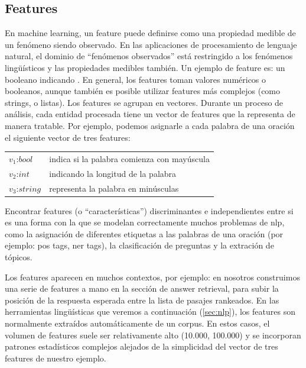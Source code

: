 \subsection*{Features}
\label{subsec:features}

En machine learning, un feature puede definirse como una propiedad medible de un fenómeno siendo observado. En las aplicaciones de procesamiento de lenguaje natural, el dominio de “fenómenos observados” está restringido a los fenómenos lingüísticos y las propiedades medibles también. Un ejemplo de feature es: un booleano indicando . En general, los features toman valores numéricos o booleanos, aunque también es posible utilizar features más complejos (como strings, o listas). Los features se agrupan en vectores. Durante un proceso de análisis, cada entidad procesada tiene un vector de features que la representa de manera tratable. Por ejemplo, podemos asignarle a cada palabra de una oración el siguiente vector de tres features:

\begin{center}
\begin{tabular}{ll}
$v_1$:$bool$ & indica si la palabra comienza con mayúscula \\
$v_2$:$int$ & indicando la longitud de la palabra \\
$v_3$:$string$ & representa la palabra en minúsculas \\
\end{tabular}
\end{center}


Encontrar features (o “características”) discriminantes e independientes entre si es una forma con la que se modelan correctamente muchos problemas de nlp, como la asignación de diferentes etiquetas a las palabras de una oración (por ejemplo: pos tags, ner tags), la clasificación de preguntas y la extración de tópicos. 

Los features aparecen en muchos contextos, por ejemplo: en  nosotros construimos una serie de features a mano en la sección de answer retrieval, para subir la posición de la respuesta esperada entre la lista de pasajes rankeados. En las herramientas lingüísticas que veremos a continuación (\ref{sec:nlp}), los features son normalmente extraídos automáticamente de un corpus. En estos casos, el volumen de features suele ser relativamente alto (10.000, 100.000) y se incorporan patrones estadísticos complejos alejados de la simplicidad del vector de tres features de nuestro ejemplo. 


